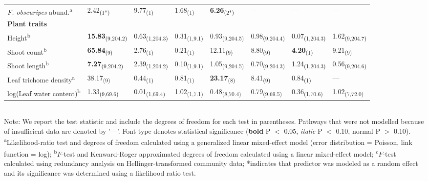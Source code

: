 \documentclass[11pt]{article}
\begin{document}
\begin{table}
\begin{tabular}{@{}llllllll@{}}
\textit{F. obscuripes} abund.\textsuperscript{a}     & 2.42\textsubscript{(1*)}       & 9.77\textsubscript{(1)}       & 1.68\textsubscript{(1)}     & \textbf{6.26}\textsubscript{(2*)}      & ---             & ---             & ---             \\
\textbf{Plant traits}             &                &               &             &               &               &               &               \\
Height\textsuperscript{b}                  & \textbf{15.83}\textsubscript{(9,204.2)} & 0.63\textsubscript{(1,204.3)} & 0.31\textsubscript{(1,9.1)} & 0.93\textsubscript{(9,204.5)} & 0.98\textsubscript{(9,204.4)} & 0.07\textsubscript{(1,204.3)} & 1.62\textsubscript{(9,204.7)} \\
Shoot count\textsuperscript{b}             & \textbf{65.84}\textsubscript{(9)}       & 2.76\textsubscript{(1)}       & 0.21\textsubscript{(1)}     & 12.11\textsubscript{(9)}      & 8.80\textsubscript{(9)}       & \textbf{4.20}\textsubscript{(1)}       & 9.21\textsubscript{(9)}       \\
Shoot length\textsuperscript{b}            & \textbf{7.27}\textsubscript{(9,204.2)}  & 2.39\textsubscript{(1,204.2)} & 0.10\textsubscript{(1,9.1)} & 1.05\textsubscript{(9,204.5)} & 0.70\textsubscript{(9,204.3)} & 1.24\textsubscript{(1,204.3)} & 0.56\textsubscript{(9,204.6)} \\
Leaf trichome density\textsuperscript{a}   & 38.17\textsubscript{(9)}       & 0.44\textsubscript{(1)}       & 0.81\textsubscript{(1)}     & \textbf{23.17}\textsubscript{(8)}      & 8.41\textsubscript{(9)}       & 0.84\textsubscript{(1)}       & ---             \\
log(Leaf water content)\textsuperscript{b} & 1.33\textsubscript{(9,69.6)}   & 0.01\textsubscript{(1,69.4)}  & 1.02\textsubscript{(1,7.1)} & 0.48\textsubscript{(8,70.4)}  & 0.79\textsubscript{(9,69.5)}  & 0.36\textsubscript{(1,70.6)}  & 1.02\textsubscript{(7,72.0)}  \\ \bottomrule
\end{tabular}
\bigskip{}
\\
{\footnotesize Note: We report the test statistic and include the degrees of freedom for each test in parentheses. Pathways that were not modelled because of insufficient data are denoted by '---'. Font type denotes statistical significance (\textbf{bold} P $<$ 0.05, \textit{italic} P $<$ 0.10, normal P $>$ 0.10). \textsuperscript{a}Likelihood-ratio test and degrees of freedom calculated using a generalized linear mixed-effect model (error distribution = Poisson, link function = log); \textsuperscript{b}$F$-test and Kenward-Roger approximated degrees of freedom calculated using a linear mixed-effect model; \textsuperscript{c}$F$-test calculated using redundancy analysis on Hellinger-transformed community data; *indicates that predictor was modeled as a random effect and its significance was determined using a likelihood ratio test.}
\end{table}
\end{document}
